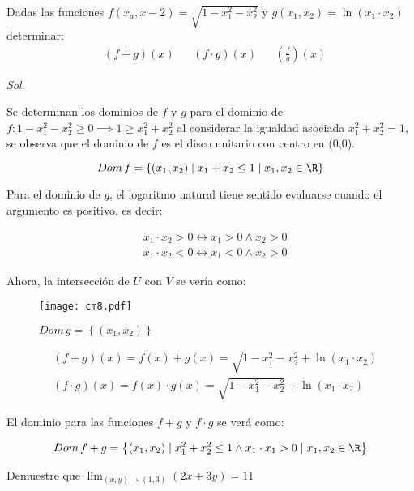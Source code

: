 \begin{example}
	Dadas las funciones $f(x_a,x-2)=\sqrt{1-x_1^2-x_2^2}$ y $g(x_1,x_2)=\ln{(x_1\cdot x_2)}$ determinar:
	\begin{align*}
		 & (f+g)(x) &  & (f\cdot g)(x) &  & \left(\frac{f}{g}\right)(x)
	\end{align*}
\end{example}

\textit{ Sol. }

Se determinan los dominios de $f$ y $g$ para el dominio de $f:1-x_1^2-x_2^2\geq 0\implies 1\geq x_1^2+x_2^2$ al
considerar la igualdad asociada $x_1^2+x_2^2=1$, se observa que el dominio de $f$ es el disco unitario
con centro en (0,0).

\begin{equation*}
	Dom\, f=\left\{(x_1,x_2)\mid x_1+x_2\leq 1\mid x_1,x_2\in \R \right\}
\end{equation*}

Para el dominio de $g$, el logaritmo natural tiene sentido evaluarse cuando el argumento es positivo.
es decir:

\begin{align*}
	 & x_1\cdot x_2>0\longleftrightarrow x_1>0\land x_2>0 \\
	 & x_1\cdot x_2<0\longleftrightarrow x_1<0\land x_2>0
\end{align*}

Ahora, la intersección de $U$ con $V$ se vería como:

\begin{figure}[h!]
	\centering
	\texttt{[image: cm8.pdf]}
	\caption{$Dom\, g= \left\{(x_1, x_2)\right\}$}
\end{figure}

\begin{align*}
	 & (f+g)(x)=f(x)+g(x)=\sqrt{1-x_1^2-x_2^2}+\ln{(x_1\cdot x_2)}           \\
	 & (f\cdot g)(x)=f(x)\cdot g(x)=\sqrt{1-x_1^2-x_2^2}+\ln{(x_1\cdot x_2)}
\end{align*}

El dominio para las funciones $f+g$ y $f\cdot g$ se verá como:

\begin{equation*}
	Dom\, f+g=\left\{(x_1,x_2)\mid x_1^2+x_2^2\leq 1\land x_1\cdot x_1>0\mid x_1,x_2\in\R                                \right\}
\end{equation*}


\begin{example}
	Demuestre que $\lim_{(x,y)\to (1,3)}(2x+3y)=11$
\end{example}

